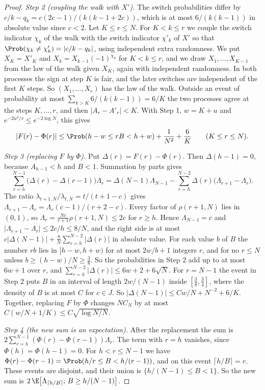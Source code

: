 \begin{proof}
\emph{Step 2 (coupling the walk with $X'$).} The switch probabilities differ
by $c/k-q_k=c(2c-1)/(k(k-1+2c))$, which is at most $6/(k(k-1))$ in absolute
value since $c<2$. Let $K\le r\le N$. For $K<k\le r$ we couple the switch
indicator $\chi_k$ of the walk with the switch indicator $\chi'_k$ of $X'$ so
that $\Prob(\chi_k\ne\chi'_k)=\lvert c/k-q_k\rvert$, using independent extra
randomness. We put $X_K=X'_K$ and $X_k=X_{k-1}(-1)^{\chi_k}$ for $K<k\le r$,
and we draw $X_1,\dots,X_{K-1}$ from the law of the walk given $X_K$, again
with independent randomness. In both processes the sign at step $K$ is fair,
and the later switches are independent of the first $K$ steps. So
$(X_1,\dots,X_r)$ has the law of the walk. Outside an event of probability at
most $\sum_{k>K}6/(k(k-1))=6/K$ the two processes agree at the steps
$K,\dots,r$, and then $\lvert A_r-A'_r\rvert<K$. With Step 1, $w=K+u$ and
$e^{-2u^2/r}\le e^{-2\log N}$, this gives
\[
\lvert F(r)-\Phi(r)\rvert\le\Prob(h-w\le rB<h+w)+\frac1{N^2}+\frac6K
\qquad(K\le r\le N).
\]

\emph{Step 3 (replacing $F$ by $\Phi$).} Put $\Delta(r)=F(r)-\Phi(r)$. Then
$\Delta(h-1)=0$, because $A_{h-1}<h$ and $B<1$. Summation by parts gives
\[
\sum_{r=h}^{N-1}\bigl(\Delta(r)-\Delta(r-1)\bigr)\Lambda_r
=\Delta(N-1)\Lambda_{N-1}-\sum_{r=h}^{N-2}\Delta(r)\bigl(\Lambda_{r+1}-\Lambda_r\bigr).
\]
The ratio $\lambda_{t+1,N}/\lambda_{t,N}=t/(t+1-c)$ gives
$\Lambda_{r+1}-\Lambda_r=\Lambda_r(c-1)/(r+2-c)$. Every factor of
$\rho(r+1,N)$ lies in $(0,1)$, so $\Lambda_r=\frac{Nc}{r+1}\rho(r+1,N)\le2c$
for $r\ge h$. Hence $\Lambda_{N-1}=c$ and
$\lvert\Lambda_{r+1}-\Lambda_r\rvert\le2c/h\le8/N$, and the right side is at
most $c\lvert\Delta(N-1)\rvert+\frac8N\sum_{r=h}^{N-2}\lvert\Delta(r)\rvert$
in absolute value. For each value $b$ of $B$ the number $rb$ lies in
$[h-w,h+w)$ for at most $2w/b+1$ integers $r$, and for no $r\le N$ unless
$b\ge(h-w)/N\ge\frac38$. So the probabilities in Step 2 add up to at most
$6w+1$ over $r$, and
$\sum_{r=h}^{N-2}\lvert\Delta(r)\rvert\le6w+2+6\sqrt N$. For $r=N-1$ the
event in Step 2 puts $B$ in an interval of length $2w/(N-1)$ inside
$[\frac38,\frac34]$, where the density of $B$ is at most $C$ for $c\in J$. So
$\lvert\Delta(N-1)\rvert\le Cw/N+N^{-2}+6/K$. Together, replacing $F$ by
$\Phi$ changes $NC_N$ by at most $C(w/N+1/K)\le C\sqrt{\log N/N}$.

\emph{Step 4 (the new sum is an expectation).} After the replacement the sum
is $2\sum_{r=h}^{N-1}(\Phi(r)-\Phi(r-1))\Lambda_r$. The term with $r=h$
vanishes, since $\Phi(h)=\Phi(h-1)=0$. For $h<r\le N-1$ we have
$\Phi(r)-\Phi(r-1)=\Prob(h/r\le B<h/(r-1))$, and on this event
$\lceil h/B\rceil=r$. These events are disjoint, and their union is
$\{h/(N-1)\le B<1\}$. So the new sum is
$2\,\E\bigl[\Lambda_{\lceil h/B\rceil};\,B\ge h/(N-1)\bigr]$.


\end{proof}
